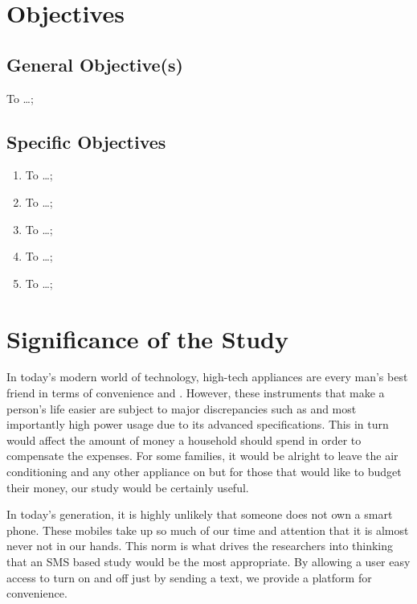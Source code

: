 \section{Objectives}
\subsection{General Objective(s)}
To \ldots;

\subsection{Specific Objectives}

\begin{enumerate}
	\item To  \ldots;
	
	\item To  \ldots;
	
	\item To  \ldots;
	
	\item To  \ldots;
	
	\item To  \ldots;
\end{enumerate}



\section{Significance of the Study}

	In today’s modern world of technology, high-tech appliances are every man’s best friend in terms of convenience and . However, these instruments that make a person’s life easier are subject to major discrepancies such as and most importantly high power usage due to its advanced specifications. This in turn would affect the amount of money a household should spend in order to compensate the expenses. For some families, it would be alright to leave the air conditioning and any other appliance on but for those that would like to budget their money, our study would be certainly useful.

	In today’s generation, it is highly unlikely that someone does not own a smart phone. These mobiles take up so much of our time and attention that it is almost never not in our hands. This norm is what drives the researchers into thinking that an SMS based study would be the most appropriate. By allowing a user easy access to turn on and off just by sending a text, we provide a platform for convenience.


